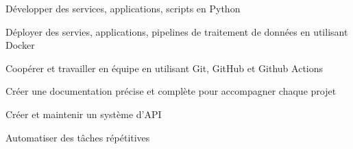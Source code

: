 

\begin{cvskills}

  \begin{minipage}[t]{0.45\textwidth}
    \cvskill
      {Développer des services, applications, scripts en Python}
  \end{minipage}\hfill
  \begin{minipage}[t]{0.45\textwidth}
    \cvskill
      {Déployer des servies, applications, pipelines de traitement de données en utilisant Docker}
  \end{minipage}

  \begin{minipage}[t]{0.45\textwidth}
    \cvskill
      {Coopérer et travailler en équipe en utilisant Git, GitHub et Github Actions}
  \end{minipage}\hfill
  \begin{minipage}[t]{0.45\textwidth}
    \cvskill
      {Créer une documentation précise et complète pour accompagner chaque projet}
  \end{minipage}

  \begin{minipage}[t]{0.45\textwidth}
    \cvskill
      {Créer et maintenir un système d'API}
  \end{minipage}\hfill
  \begin{minipage}[t]{0.45\textwidth}
    \cvskill
      {Automatiser des tâches répétitives}
  \end{minipage}

\end{cvskills}